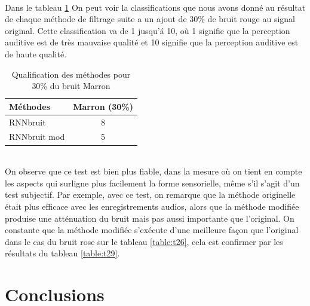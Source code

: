 \documentclass[conference,onecolumn]{IEEEtran}
\begin{document}
\hfill \\
Dans le tableau \ref{table:t30} On peut voir la classifications que nous avons donné au résultat de chaque méthode de filtrage suite a un ajout de 30\% de bruit rouge au signal original. Cette classification va de 1 jusqu'á 10, où 1 signifie que la perception auditive est de très mauvaise qualité et 10 signifie que la perception auditive est de haute qualité.
\begin{table}[H]
    \centering
    \begin{tabular}{ l  c }
    \textbf{Méthodes} & \textbf{Marron (30\%)} \\
    \hline
    RNNbruit & 8 \\
    RNNbruit mod &  5 \\
    \end{tabular}
    \caption{Qualification des méthodes pour 30\% du bruit Marron}
    \label{table:t30}
\end{table}
\hfill \\

On observe que ce test est bien plus fiable, dans la mesure où on tient en compte les aspects qui surligne plus facilement la forme sensorielle, même s’il s’agit d’un test subjectif. Par exemple, avec ce test, on remarque que la méthode originelle était plus efficace avec les enregistrements audios, alors que la méthode modifiée produise une atténuation du bruit mais pas aussi importante que l’original. On constante que la méthode modifiée s’exécute d’une meilleure façon que l’original dans le cas du bruit rose sur le tableau \ref{table:t26}, cela est confirmer par les résultats du tableau \ref{table:t29}.

\newpage
\section{Conclusions}
\hfill \\
\end{document}
